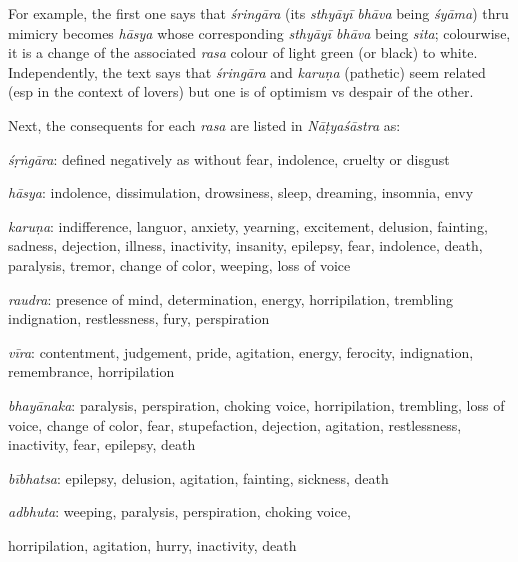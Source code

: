 For example, the first one says that \textsl{śringāra} (its \textsl{sthyāyī} \textsl{bhāva} being \textsl{śyāma}) thru mimicry becomes \textsl{hāsya} whose corresponding \textsl{sthyāyī bhāva} being \textsl{sita}; colourwise, it is a change of the associated \textsl{rasa} colour of light green (or black) to white. Independently, the text says that \textsl{śringāra} and \textsl{karuṇa} (pathetic) seem related (esp in the context of lovers) but one is of optimism vs despair of the other. 

Next, the consequents for each \textsl{rasa} are listed in \textsl{Nāṭyaśāstra} as: 

\textsl{śṛṅgāra}: defined negatively as without fear, indolence, cruelty or disgust

\textsl{hāsya}: indolence, dissimulation, drowsiness, sleep, dreaming, insomnia, envy

\textsl{karuṇa}: indifference, languor, anxiety, yearning, excitement, delusion, fainting, sadness, dejection, illness, inactivity, insanity, epilepsy, fear, indolence, death, paralysis, tremor, change of color, weeping, loss of voice

\textsl{raudra}: presence of mind, determination, energy, horripilation, trembling indignation, restlessness, fury, perspiration

\textsl{vīra}: contentment, judgement, pride, agitation, energy, ferocity, indignation, remembrance, horripilation

\textsl{bhayānaka}: paralysis, perspiration, choking voice, horripilation, trembling, loss of voice, change of color, fear, stupefaction, dejection, agitation, restlessness, inactivity, fear, epilepsy, death

\textsl{bībhatsa}: epilepsy, delusion, agitation, fainting, sickness, death

\textsl{adbhuta}: weeping, paralysis, perspiration, choking voice, 

horripilation, agitation, hurry, inactivity, death


